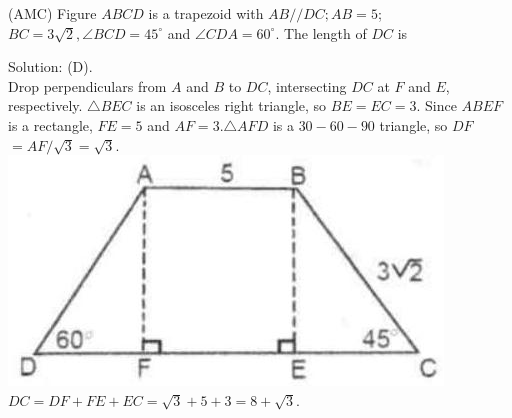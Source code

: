 \documentclass{article}
\begin{document}
(AMC) Figure \(A B C D\) is a trapezoid with \(A B / / D C ; A B=5\);\\
\(B C=3 \sqrt{2}, \angle B C D=45^{\circ}\) and \(\angle C D A=60^{\circ}\). The length of \(D C\) is

Solution: (D).\\
Drop perpendiculars from \(A\) and \(B\) to \(D C\), intersecting \(D C\) at \(F\) and \(E\), respectively. \(\triangle B E C\) is an isosceles right triangle, so \(B E=E C=3\). Since \(A B E F\) is a rectangle, \(F E=5\) and \(A F=3 . \triangle A F D\) is a \(30-60-90\) triangle, so \(D F\) \(=A F / \sqrt{3}=\sqrt{3}\).\\
\centering
\includegraphics[width=\textwidth]{images/076(2).jpg}\\
\(D C=D F+F E+E C=\sqrt{3}+5+3=8+\sqrt{3}\).
\end{document}
